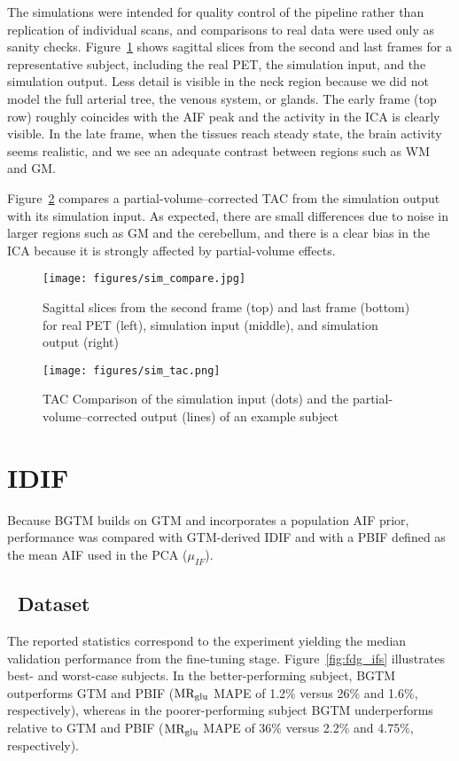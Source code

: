 The simulations were intended for quality control of the pipeline rather than replication of individual scans, and comparisons to real data were used only as sanity checks.
Figure~\ref{fig:sim_compare_imgs} shows sagittal slices from the second and last frames for a representative subject, including the real PET, the simulation input, and the simulation output.
Less detail is visible in the neck region because we did not model the full arterial tree, the venous system, or glands.
The early frame (top row) roughly coincides with the AIF peak and the activity in the ICA is clearly visible.
In the late frame, when the tissues reach steady state, the brain activity seems realistic, and we see an adequate contrast between regions such as WM and GM.

Figure~\ref{fig:sim_tac_compare} compares a partial-volume–corrected TAC from the simulation output with its simulation input.
As expected, there are small differences due to noise in larger regions such as GM and the cerebellum, and there is a clear bias in the ICA because it is strongly affected by partial-volume effects.

\begin{figure}[h]
	\centering
	\texttt{[image: figures/sim\_compare.jpg]}
	\caption{Sagittal slices from the second frame (top) and last frame (bottom) for real PET (left), simulation input (middle), and simulation output (right)}
	\label{fig:sim_compare_imgs}
\end{figure}

\begin{figure}[h]
	\centering
	\texttt{[image: figures/sim\_tac.png]}
	\caption{TAC Comparison of the simulation input (dots) and the partial-volume–corrected output (lines) of an example subject}
	\label{fig:sim_tac_compare}
\end{figure}

\section{IDIF}
Because BGTM builds on GTM and incorporates a population AIF prior, performance was compared with GTM-derived IDIF and with a PBIF defined as the mean AIF used in the PCA (\(\mu_{IF}\)).

\subsection{\fdg\ Dataset}
The reported statistics correspond to the experiment yielding the median validation performance from the fine-tuning stage.
Figure~\ref{fig:fdg_ifs} illustrates best- and worst-case subjects.
In the better-performing subject, BGTM outperforms GTM and PBIF (\(\text{MR}_{\text{glu}}\) MAPE of 1.2\% versus 26\% and 1.6\%, respectively), whereas in the poorer-performing subject BGTM underperforms relative to GTM and PBIF (\(\text{MR}_{\text{glu}}\) MAPE of 36\% versus 2.2\% and 4.75\%, respectively).

